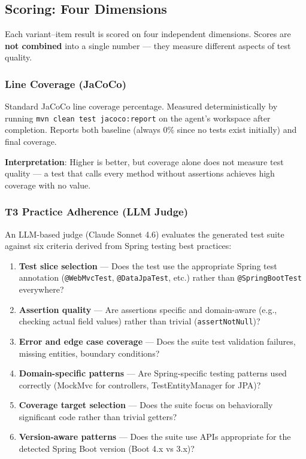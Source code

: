 \documentclass[11pt,a4paper]{article}
\begin{document}
\subsection{Scoring: Four Dimensions}
\label{sec:scoring}

Each variant--item result is scored on four independent dimensions.
Scores are \textbf{not combined} into a single number --- they measure
different aspects of test quality.

\subsubsection{Line Coverage (JaCoCo)}

Standard JaCoCo line coverage percentage. Measured deterministically by running
\texttt{mvn clean test jacoco:report} on the agent's workspace after completion.
Reports both baseline (always 0\% since no tests exist initially) and final coverage.

\textbf{Interpretation}: Higher is better, but coverage alone does not measure
test quality --- a test that calls every method without assertions achieves high
coverage with no value.

\subsubsection{T3 Practice Adherence (LLM Judge)}

An LLM-based judge (Claude Sonnet 4.6) evaluates the generated test suite against
six criteria derived from Spring testing best practices:

\begin{enumerate}
  \item \textbf{Test slice selection} --- Does the test use the appropriate Spring test annotation (\texttt{@WebMvcTest}, \texttt{@DataJpaTest}, etc.) rather than \texttt{@SpringBootTest} everywhere?
  \item \textbf{Assertion quality} --- Are assertions specific and domain-aware (e.g., checking actual field values) rather than trivial (\texttt{assertNotNull})?
  \item \textbf{Error and edge case coverage} --- Does the suite test validation failures, missing entities, boundary conditions?
  \item \textbf{Domain-specific patterns} --- Are Spring-specific testing patterns used correctly (MockMvc for controllers, TestEntityManager for JPA)?
  \item \textbf{Coverage target selection} --- Does the suite focus on behaviorally significant code rather than trivial getters?
  \item \textbf{Version-aware patterns} --- Does the suite use APIs appropriate for the detected Spring Boot version (Boot 4.x vs 3.x)?
\end{enumerate}
\end{document}
